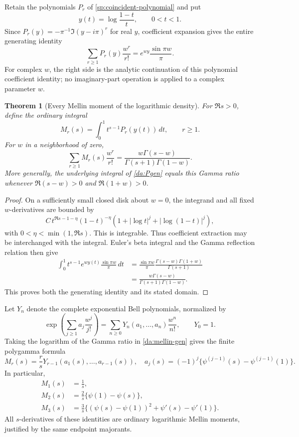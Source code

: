 \documentclass[11pt,letterpaper]{article}
\numberwithin{equation}{section}
\newtheorem{theorem}{Theorem}[section]
\theoremstyle{definition}
\theoremstyle{remark}
\newcommand{\dd}{\,d}
\begin{document}
Retain the polynomials \(P_r\) of \eqref{sp:coincident-polynomial} and put
\[
 y(t)=\log\frac{1-t}{t},\qquad 0<t<1.
\]
Since \(P_r(y)=-\pi^{-1}\Im(y-i\pi)^r\) for real \(y\), coefficient
expansion gives the entire generating identity
\begin{equation}\label{da:Pgen}
 \sum_{r\ge1}P_r(y)\frac{w^r}{r!}
       =e^{wy}\frac{\sin\pi w}{\pi}.
\end{equation}
For complex \(w\), the right side is the analytic continuation of this
polynomial coefficient identity; no imaginary-part operation is applied
to a complex parameter \(w\).

\begin{theorem}[Every Mellin moment of the logarithmic density]
\label{da:mellin}
For \(\Re s>0\), define the ordinary integral
\[
 M_r(s)=\int_0^1 t^{s-1}P_r(y(t))\dd t,\qquad r\ge1.
\]
For \(w\) in a neighborhood of zero,
\begin{equation}\label{da:mellin-gen}
 \boxed{\displaystyle
  \sum_{r\ge1}M_r(s)\frac{w^r}{r!}
     =\frac{w\Gamma(s-w)}{\Gamma(s+1)\Gamma(1-w)}.}
\end{equation}
More generally, the underlying integral of \eqref{da:Pgen} equals this
Gamma ratio whenever \(\Re(s-w)>0\) and \(\Re(1+w)>0\).
\end{theorem}

\begin{proof}
On a sufficiently small closed disk about \(w=0\), the integrand and all
fixed \(w\)-derivatives are bounded by
\[
 C\,t^{\Re s-1-\eta}(1-t)^{-\eta}
       (1+|\log t|^j+|\log(1-t)|^j),
\]
with \(0<\eta<\min(1,\Re s)\). This is integrable. Thus
coefficient extraction may be interchanged with the integral.
Euler's beta integral and the Gamma reflection relation then give
\begin{align*}
 \int_0^1t^{s-1}e^{wy(t)}\frac{\sin\pi w}{\pi}\dd t
 &=\frac{\sin\pi w}{\pi}
      \frac{\Gamma(s-w)\Gamma(1+w)}{\Gamma(s+1)}\\
 &=\frac{w\Gamma(s-w)}{\Gamma(s+1)\Gamma(1-w)}.
\end{align*}
This proves both the generating identity and its stated domain.
\end{proof}

Let \(Y_n\) denote the complete exponential Bell polynomials, normalized by
\[
 \exp\left(\sum_{j\ge1}a_j\frac{w^j}{j!}\right)
      =\sum_{n\ge0}Y_n(a_1,\ldots,a_n)\frac{w^n}{n!},
 \qquad Y_0=1.
\]
Taking the logarithm of the Gamma ratio in \eqref{da:mellin-gen} gives
the finite polygamma formula
\begin{equation}\label{da:polygamma-moment}
 M_r(s)=\frac r{s}Y_{r-1}(a_1(s),\ldots,a_{r-1}(s)),
 \quad
 a_j(s)=(-1)^j\{\psi^{(j-1)}(s)-\psi^{(j-1)}(1)\}.
\end{equation}
In particular,
\begin{align*}
 M_1(s)&=\frac1s,\\
 M_2(s)&=\frac2s\{\psi(1)-\psi(s)\},\\
 M_3(s)&=\frac3s\bigl\{(\psi(s)-\psi(1))^2+
                                   \psi'(s)-\psi'(1)\bigr\}.
\end{align*}
All \(s\)-derivatives of these identities are ordinary logarithmic Mellin
moments, justified by the same endpoint majorants.
\end{document}
